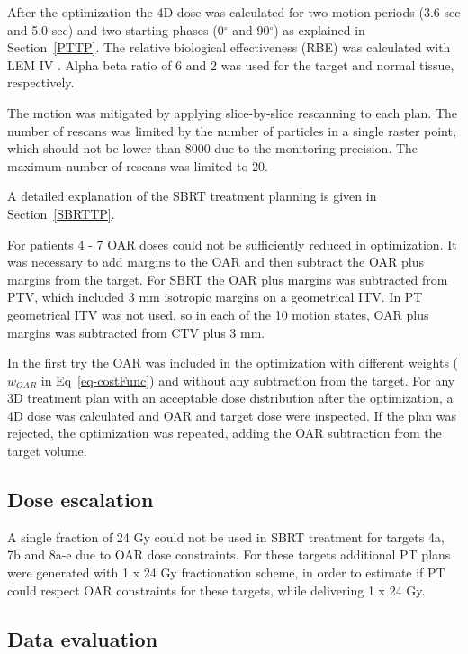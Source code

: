 After the optimization the 4D-dose was calculated for two motion periods (3.6 sec and 5.0 sec) and two starting phases (0$^\circ$ and 90$^\circ$) as explained in Section~\ref{PTTP}. 
The relative biological effectiveness (RBE) was calculated with LEM IV \cite{Elsaesser2010}. 
Alpha beta ratio of 6 and 2 was used for the target and normal tissue, respectively.

The motion was mitigated by applying slice-by-slice rescanning to each plan. 
The number of rescans was limited by the number of particles in a single raster point, which should not be lower than 8000 due to the
monitoring precision. The maximum number of rescans was limited to 20.

A detailed explanation of the SBRT treatment planning is given in Section~\ref{SBRTTP}.

For patients 4 - 7 OAR doses could not be sufficiently reduced in optimization. It was necessary to add margins to the OAR and then 
subtract the OAR plus margins from the target. For SBRT the OAR plus margins was subtracted from PTV, which included 3 mm isotropic margins on a geometrical ITV. 
In PT geometrical ITV was not used, so in each of the 10 motion states, OAR plus margins was subtracted from CTV plus 3 mm. 

In the first try the OAR was included in the optimization with different weights ($w_{OAR}$ in Eq~\ref{eq-costFunc}) and without any subtraction from the target. 
For any 3D treatment plan with an acceptable dose distribution after the optimization, a 4D dose was calculated and OAR and target dose were inspected. If the plan was rejected, the optimization was repeated, adding the OAR subtraction from the target volume. 


\newpage
\subsection{Dose escalation}

A single fraction of 24 Gy could not be used in SBRT treatment for targets 4a, 7b and 8a-e due to OAR dose constraints. For these targets additional 
PT plans were generated with 1 x 24 Gy fractionation scheme, in order
to estimate if PT could respect OAR constraints for these targets, while delivering 1 x 24 Gy. 

\subsection{Data evaluation}

